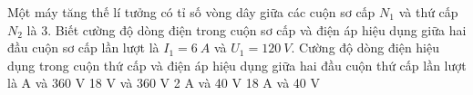 \begin{vidu} %
	Một máy tăng thế lí tưởng có tỉ số vòng dây giữa các cuộn sơ cấp $N_1$ và thứ cấp $N_2$ là 3. Biết cường độ dòng điện trong cuộn sơ cấp và điện áp hiệu dụng giữa hai đầu cuộn sơ cấp lần lượt là ${I_1}=6\ A$ và ${U_1}=120\ V$. Cường độ dòng điện hiệu dụng trong cuộn thứ cấp và điện áp hiệu dụng giữa hai đầu cuộn thứ cấp lần lượt là
	\choice
	{ A và 360 V}
	{18 V và 360 V}
	{2 A và 40 V}
	{18 A và 40 V}
\end{vidu}